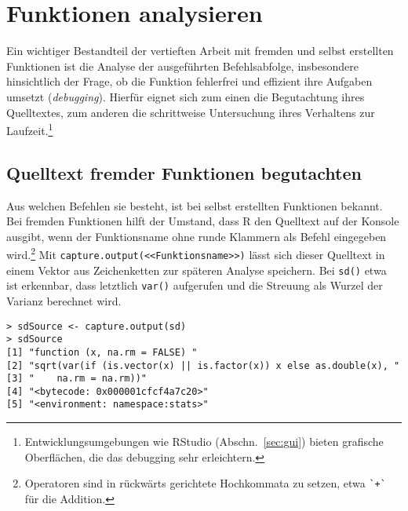 \section{Funktionen analysieren}
\label{sec:debug}

Ein wichtiger Bestandteil der vertieften Arbeit mit fremden und selbst erstellten Funktionen ist die Analyse der ausgeführten Befehlsabfolge, insbesondere hinsichtlich der Frage, ob die Funktion fehlerfrei und effizient ihre Aufgaben umsetzt (\emph{debugging}). Hierfür eignet sich zum einen die Begutachtung ihres Quelltextes, zum anderen die schrittweise Untersuchung ihres Verhaltens zur Laufzeit.\footnote{Entwicklungsumgebungen wie RStudio (Abschn.\ \ref{sec:gui}) bieten grafische Oberflächen, die das debugging sehr erleichtern.}

\subsection{Quelltext fremder Funktionen begutachten}
\label{sec:debugForeign}

Aus welchen Befehlen sie besteht, ist bei selbst erstellten Funktionen bekannt. Bei fremden Funktionen hilft der Umstand, dass R den Quelltext auf der Konsole ausgibt, wenn der Funktionsname ohne runde Klammern als Befehl eingegeben wird.\footnote{Operatoren sind in rückwärts gerichtete Hochkommata zu setzen, etwa \lstinline!`+`! für die Addition.} Mit \lstinline!capture.output(<<Funktionsname>>)! lässt sich dieser Quelltext in einem Vektor aus Zeichenketten zur späteren Analyse speichern. Bei \lstinline!sd()! etwa ist erkennbar, dass letztlich \lstinline!var()! aufgerufen und die Streuung als Wurzel der Varianz berechnet wird.
\begin{lstlisting}
> sdSource <- capture.output(sd)
> sdSource
[1] "function (x, na.rm = FALSE) "                                    
[2] "sqrt(var(if (is.vector(x) || is.factor(x)) x else as.double(x), "
[3] "    na.rm = na.rm))"                                             
[4] "<bytecode: 0x000001cfcf4a7c20>"                                  
[5] "<environment: namespace:stats>"
\end{lstlisting}

